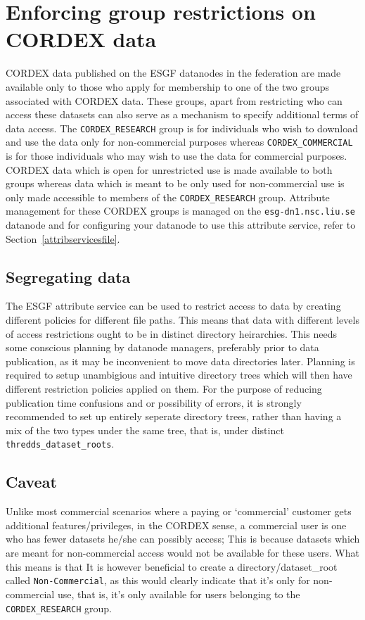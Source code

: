 \section{Enforcing group restrictions on CORDEX data}
\label{enforcegrouprestrictions}
CORDEX data published on the ESGF datanodes in the federation are made available only to those who apply for membership to one of the two groups associated with CORDEX data. These groups, apart from restricting who can access these datasets can also serve as a mechanism to specify additional terms of data access.  The \texttt{CORDEX\_RESEARCH} group is for individuals who wish to download and use the data only for non-commercial purposes whereas \texttt{CORDEX\_COMMERCIAL} is for those individuals who may wish to use the data for commercial purposes. CORDEX data which is open for unrestricted use is made available to both groups whereas data which is meant to be only used for non-commercial use is only made accessible to members of the \texttt{CORDEX\_RESEARCH} group.  Attribute management for these CORDEX groups is managed on the \texttt{esg-dn1.nsc.liu.se} datanode and for configuring your datanode to use this attribute service, refer to Section~\ref{attribservicesfile}.
\subsection{Segregating data}
The ESGF attribute service can be used to restrict access to data by creating different policies for different file paths. This means that data with different levels of access restrictions ought to be in distinct directory heirarchies. This needs some conscious planning by datanode managers, preferably prior to data publication, as it may be inconvenient to move data directories later. Planning is required to setup unambigious and intuitive directory trees which will then have different restriction policies applied on them. For the purpose of reducing publication time confusions and or possibility of errors, it is strongly recommended to set up entirely seperate directory trees, rather than having a mix of the two types under the same tree, that is, under distinct  \texttt{thredds\_dataset\_roots}.
\subsection{Caveat}
Unlike most commercial scenarios where a paying or `commercial' customer gets additional features/privileges, in the CORDEX sense, a commercial user is one who has fewer datasets he/she can possibly access; This is because datasets which are meant for non-commercial access would not be available for these users.  What this means is that   It is however beneficial to create a directory/dataset\_root called \texttt{Non-Commercial}, as this would clearly indicate that it's only for non-commercial use, that is, it's only available for users belonging to the \texttt{CORDEX\_RESEARCH} group. 
